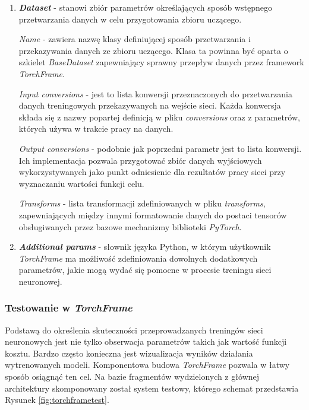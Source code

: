 \begin{enumerate}
    \item \textbf{\textit{Dataset}} - stanowi zbiór parametrów określających sposób
    wstępnego przetwarzania danych w celu przygotowania zbioru uczącego.

    \textit{Name} - zawiera nazwę klasy definiującej sposób przetwarzania
    i przekazywania danych ze zbioru uczącego. Klasa ta powinna być oparta o
    szkielet \textit{BaseDataset} zapewniający sprawny przepływ danych przez framework
    \textit{TorchFrame}.

    \textit{Input conversions} - jest to lista konwersji przeznaczonych do
    przetwarzania danych treningowych przekazywanych na wejście sieci. Każda
    konwersja składa się z nazwy popartej definicją w pliku \textit{conversions} oraz z
    parametrów, których używa w trakcie pracy na danych.

    \textit{Output conversions} - podobnie jak poprzedni parametr jest to lista
    konwersji. Ich implementacja pozwala przygotować zbiór danych wyjściowych
    wykorzystywanych jako punkt odniesienie dla rezultatów pracy sieci przy wyznaczaniu
    wartości funkcji celu.

    \textit{Transforms} - lista transformacji zdefiniowanych w pliku \textit{transforms},
    zapewniających między innymi formatowanie danych do postaci tensorów
    obsługiwanych przez bazowe mechanizmy biblioteki \textit{PyTorch}.

    \item \textbf{\textit{Additional params}} - słownik języka Python, w którym użytkownik
    \textit{TorchFrame} ma możliwość zdefiniowania dowolnych dodatkowych parametrów, jakie
    mogą wydać się pomocne w procesie treningu sieci neuronowej.

    \end{enumerate}

  \subsubsection{Testowanie w \textit{TorchFrame}}
    Podstawą do określenia skuteczności przeprowadzanych treningów sieci neuronowych
    jest nie tylko obserwacja parametrów takich jak wartość funkcji kosztu. Bardzo
    często konieczna jest wizualizacja wyników działania wytrenowanych modeli.
    Komponentowa budowa \textit{TorchFrame} pozwala w łatwy sposób osiągnąć ten cel.
    Na bazie fragmentów wydzielonych z głównej architektury skomponowany został
    system testowy, którego schemat przedstawia Rysunek \ref{fig:torchframetest}.

